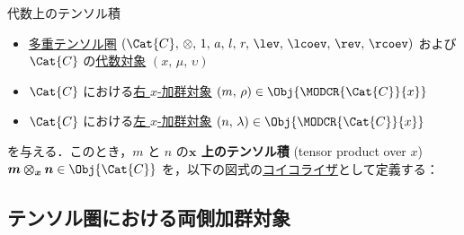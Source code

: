 \documentclass[TQFT_main]{subfiles}
\begin{document}
\begin{mydef}[label=def:tensor-overalg]{代数上のテンソル積}
    \begin{itemize}
        \item \hyperref[def:tensorfusion-cat]{多重テンソル圏} $(\Cat{C},\, \otimes,\, 1,\, a,\, l,\, r,\, \lev,\, \lcoev,\, \rev,\, \rcoev)$ および $\Cat{C}$ の\hyperref[def:algobj]{代数対象} $(x,\, \mu,\, \upsilon)$
        \item $\Cat{C}$ における\hyperref[def:moduleobj]{右 $x$-加群対象} $(m,\, \rho) \in \Obj{\MODCR{\Cat{C}}{x}}$
        \item $\Cat{C}$ における\hyperref[def:moduleobj]{左 $x$-加群対象} $(n,\, \lambda) \in \Obj{\MODCR{\Cat{C}}{x}}$
    \end{itemize}
    を与える．このとき，$m$ と $n$ の\textbf{$\bm{x}$ 上のテンソル積} (tensor product over $x$) $\bm{m \otimes_x n} \in \Obj{\Cat{C}}$ を，以下の図式の\hyperref[def:eq-coeq]{コイコライザ}として定義する：
    \begin{center}
    \end{center}
\end{mydef}

\subsection{テンソル圏における両側加群対象}
\end{document}

